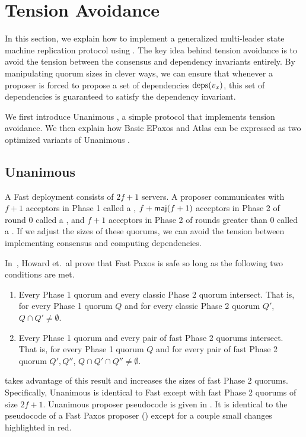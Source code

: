 \section{Tension Avoidance}
In this section, we explain how to implement a generalized multi-leader state
machine replication protocol using . The key idea
behind tension avoidance is to avoid the tension between the consensus and
dependency invariants entirely. By manipulating quorum sizes in clever ways, we
can ensure that whenever a proposer is forced to propose a set of dependencies
$\text{deps}(v_x)$, this set of dependencies is guaranteed to satisfy the dependency
invariant.

We first introduce Unanimous \BPaxos{}, a simple protocol that implements
tension avoidance. We then explain how Basic EPaxos and Atlas can be expressed
as two optimized variants of Unanimous \BPaxos{}.

\subsection{Unanimous \BPaxos{}}
A Fast \BPaxos{} deployment consists of $2f+1$ servers. A proposer communicates
with $f+1$ acceptors in Phase 1 called a , $f +
\textsf{maj}(f+1)$ acceptors in Phase 2 of round $0$ called a , and $f + 1$ acceptors in Phase 2 of rounds greater than $0$ called a
. If we adjust the sizes of these quorums, we
can avoid the tension between implementing consensus and computing
dependencies.

In~\cite{howard2021fast}, Howard et.\ al prove that Fast Paxos is safe so long
as the following two conditions are met.
\begin{enumerate}
  \item
    Every Phase 1 quorum and every classic Phase 2 quorum intersect. That is,
    for every Phase 1 quorum $Q$ and for every classic Phase 2 quorum $Q'$, $Q
    \cap Q' \neq \emptyset$.

  \item
    Every Phase 1 quorum and every pair of fast Phase 2 quorums intersect. That
    is, for every Phase 1 quorum $Q$ and for every pair of fast Phase 2 quorum
    $Q', Q''$, $Q \cap Q' \cap Q'' \neq \emptyset$.
\end{enumerate}

 takes advantage of this result and increases the
sizes of fast Phase 2 quorums. Specifically, Unanimous \BPaxos{} is identical
to Fast \BPaxos{} except with fast Phase 2 quorums of size $2f+1$. Unanimous
\BPaxos{} proposer pseudocode is given in . It
is identical to the pseudocode of a Fast Paxos proposer
() except for a couple small changes highlighted in
red.


